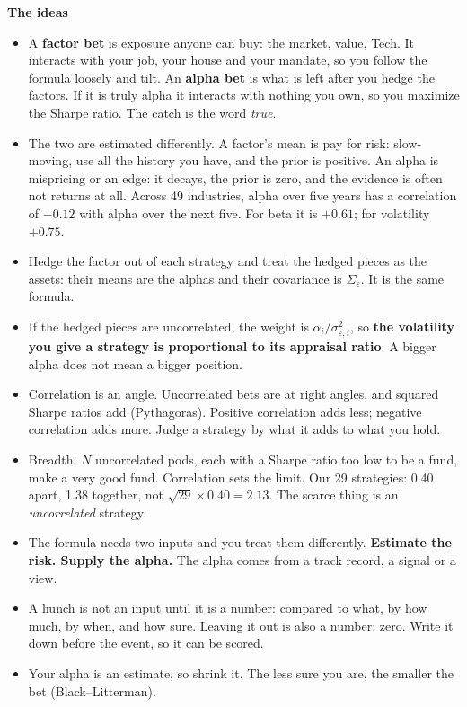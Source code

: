 \documentclass[11pt]{article}
\newcounter{ex}[section]
\newcommand{\head}[1]{\par\medskip\textbf{#1}\par}
\begin{document}
\head{The ideas}
\begin{itemize}
\item A \textbf{factor bet} is exposure anyone can buy: the market, value, Tech. It interacts with your job, your house
and your mandate, so you follow the formula loosely and tilt. An \textbf{alpha bet} is what is left after you hedge the
factors. If it is truly alpha it interacts with nothing you own, so you maximize the Sharpe ratio. The catch is the
word \emph{true}.
\item The two are estimated differently. A factor's mean is pay for risk: slow-moving, use all the history you have,
and the prior is positive. An alpha is mispricing or an edge: it decays, the prior is zero, and the evidence is often
not returns at all. Across 49 industries, alpha over five years has a correlation of $-0.12$ with alpha over the next
five. For beta it is $+0.61$; for volatility $+0.75$.
\item Hedge the factor out of each strategy and treat the hedged pieces as the assets: their means are the alphas and
their covariance is $\Sigma_{\varepsilon}$. It is the same formula.
\item If the hedged pieces are uncorrelated, the weight is $\alpha_{i}/\sigma_{\varepsilon,i}^{2}$, so \textbf{the volatility
you give a strategy is proportional to its appraisal ratio}. A bigger alpha does not mean a bigger position.
\item Correlation is an angle. Uncorrelated bets are at right angles, and squared Sharpe ratios add (Pythagoras).
Positive correlation adds less; negative correlation adds more. Judge a strategy by what it adds to what you hold.
\item Breadth: $N$ uncorrelated pods, each with a Sharpe ratio too low to be a fund, make a very good fund. Correlation
sets the limit. Our 29 strategies: 0.40 apart, 1.38 together, not $\sqrt{29}\times 0.40 = 2.13$. The scarce thing is an
\emph{uncorrelated} strategy.
\item The formula needs two inputs and you treat them differently. \textbf{Estimate the risk. Supply the alpha.} The
alpha comes from a track record, a signal or a view.
\item A hunch is not an input until it is a number: compared to what, by how much, by when, and how sure. Leaving it out
is also a number: zero. Write it down before the event, so it can be scored.
\item Your alpha is an estimate, so shrink it. The less sure you are, the smaller the bet (Black--Litterman).
\end{itemize}
\end{document}
